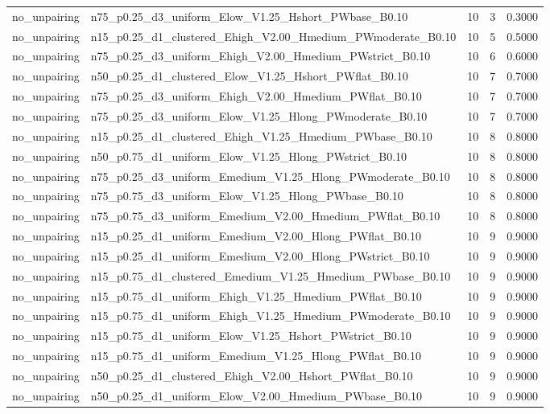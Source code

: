 \begin{tabular}{llrrr}
no_unpairing & n75_p0.25_d3_uniform_Elow_V1.25_Hshort_PWbase_B0.10 & 10 & 3 & 0.3000 \\
no_unpairing & n15_p0.25_d1_clustered_Ehigh_V2.00_Hmedium_PWmoderate_B0.10 & 10 & 5 & 0.5000 \\
no_unpairing & n75_p0.25_d3_uniform_Ehigh_V2.00_Hmedium_PWstrict_B0.10 & 10 & 6 & 0.6000 \\
no_unpairing & n50_p0.25_d1_clustered_Elow_V1.25_Hshort_PWflat_B0.10 & 10 & 7 & 0.7000 \\
no_unpairing & n75_p0.25_d3_uniform_Ehigh_V2.00_Hmedium_PWflat_B0.10 & 10 & 7 & 0.7000 \\
no_unpairing & n75_p0.25_d3_uniform_Elow_V1.25_Hlong_PWmoderate_B0.10 & 10 & 7 & 0.7000 \\
no_unpairing & n15_p0.25_d1_clustered_Ehigh_V1.25_Hmedium_PWbase_B0.10 & 10 & 8 & 0.8000 \\
no_unpairing & n50_p0.75_d1_uniform_Elow_V1.25_Hlong_PWstrict_B0.10 & 10 & 8 & 0.8000 \\
no_unpairing & n75_p0.25_d3_uniform_Emedium_V1.25_Hlong_PWmoderate_B0.10 & 10 & 8 & 0.8000 \\
no_unpairing & n75_p0.75_d3_uniform_Elow_V1.25_Hlong_PWbase_B0.10 & 10 & 8 & 0.8000 \\
no_unpairing & n75_p0.75_d3_uniform_Emedium_V2.00_Hmedium_PWflat_B0.10 & 10 & 8 & 0.8000 \\
no_unpairing & n15_p0.25_d1_uniform_Emedium_V2.00_Hlong_PWflat_B0.10 & 10 & 9 & 0.9000 \\
no_unpairing & n15_p0.25_d1_uniform_Emedium_V2.00_Hlong_PWstrict_B0.10 & 10 & 9 & 0.9000 \\
no_unpairing & n15_p0.75_d1_clustered_Emedium_V1.25_Hmedium_PWbase_B0.10 & 10 & 9 & 0.9000 \\
no_unpairing & n15_p0.75_d1_uniform_Ehigh_V1.25_Hmedium_PWflat_B0.10 & 10 & 9 & 0.9000 \\
no_unpairing & n15_p0.75_d1_uniform_Ehigh_V1.25_Hmedium_PWmoderate_B0.10 & 10 & 9 & 0.9000 \\
no_unpairing & n15_p0.75_d1_uniform_Elow_V1.25_Hshort_PWstrict_B0.10 & 10 & 9 & 0.9000 \\
no_unpairing & n15_p0.75_d1_uniform_Emedium_V1.25_Hlong_PWflat_B0.10 & 10 & 9 & 0.9000 \\
no_unpairing & n50_p0.25_d1_clustered_Ehigh_V2.00_Hshort_PWflat_B0.10 & 10 & 9 & 0.9000 \\
no_unpairing & n50_p0.25_d1_uniform_Elow_V2.00_Hmedium_PWbase_B0.10 & 10 & 9 & 0.9000 \\

\end{tabular}
